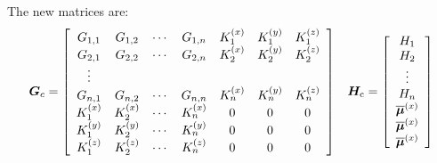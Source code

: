 \documentclass[a4paper]{report}
\newcommand{\bs}{\boldsymbol}
\newcommand{\mr}{\mathrm}
\begin{document}
The new matrices are:
\begin{equation}
\bs{G}_c = \left[ \begin{array}{ccccccccr} 
G_{1,1}   & G_{1,2}   & \cdots & G_{1,n}   & K_1^{(x)} & K_1^{(y)} & K_1^{(z)} \\
G_{2,1}   & G_{2,2}   & \cdots & G_{2,n}   & K_2^{(x)} & K_2^{(y)} & K_2^{(z)} \\
\vdots \\
G_{n,1}   & G_{n,2}   & \cdots & G_{n,n}   & K_n^{(x)} & K_n^{(y)} & K_n^{(z)} \\
K_1^{(x)} & K_2^{(x)} & \cdots & K_n^{(x)} & 0         & 0         & 0         \\
K_1^{(y)} & K_2^{(y)} & \cdots & K_n^{(y)} & 0         & 0         & 0         \\
K_1^{(z)} & K_2^{(z)} & \cdots & K_n^{(z)} & 0         & 0         & 0         \\
\end{array} \right] \hspace{0.3cm} \bs{H}_\mr{c} = \left[ \begin{array}{c} H_1 \\ H_2
\\ \vdots \\ H_n \\ \overline{\bs{\mu}}^{(x)} \\
\overline{\bs{\mu}}^{(x)} \\ \overline{\bs{\mu}}^{(x)} \end{array}
\right]
\end{equation}
\end{document}
